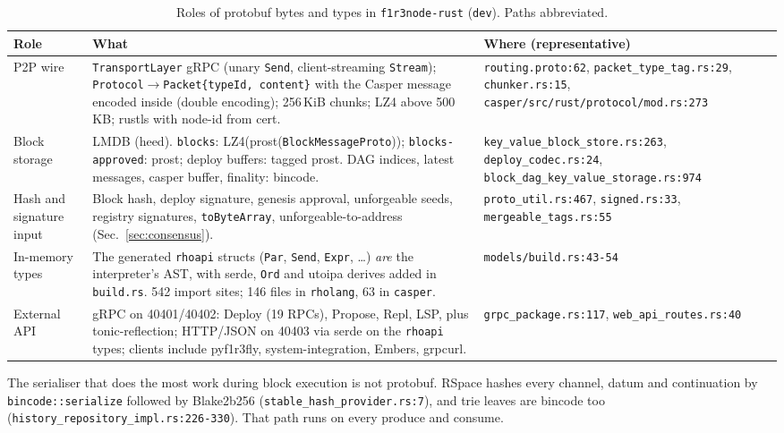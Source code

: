 \documentclass[10pt,a4paper]{article}
\newcommand{\f}[1]{\nolinkurl{#1}}
\begin{document}
\begin{table}[h]
\centering\small
\begin{tabular}{@{}L{2.6cm}L{7.4cm}L{5.4cm}@{}}
\toprule
Role & What & Where (representative) \\
\midrule
P2P wire &
  \f{TransportLayer} gRPC (unary \f{Send}, client-streaming \f{Stream}); \f{Protocol}$\to$\texttt{Packet\{typeId, content\}} with the Casper message encoded inside (double encoding); 256\,KiB chunks; LZ4 above 500\,KB; rustls with node-id from cert. &
  \f{routing.proto:62}, \f{packet_type_tag.rs:29}, \f{chunker.rs:15}, \f{casper/src/rust/protocol/mod.rs:273} \\
Block storage &
  LMDB (heed). \f{blocks}: LZ4(prost(\f{BlockMessageProto})); \f{blocks-approved}: prost; deploy buffers: tagged prost. DAG indices, latest messages, casper buffer, finality: bincode. &
  \f{key_value_block_store.rs:263}, \f{deploy_codec.rs:24}, \f{block_dag_key_value_storage.rs:974} \\
Hash and signature input &
  Block hash, deploy signature, genesis approval, unforgeable seeds, registry signatures, \f{toByteArray}, unforgeable-to-address (Sec.~\ref{sec:consensus}). &
  \f{proto_util.rs:467}, \f{signed.rs:33}, \f{mergeable_tags.rs:55} \\
In-memory types &
  The generated \f{rhoapi} structs (\f{Par}, \f{Send}, \f{Expr}, \ldots) \emph{are} the interpreter's AST, with serde, \f{Ord} and utoipa derives added in \f{build.rs}. 542 import sites; 146 files in \f{rholang}, 63 in \f{casper}. &
  \f{models/build.rs:43-54} \\
External API &
  gRPC on 40401/40402: Deploy (19 RPCs), Propose, Repl, LSP, plus tonic-reflection; HTTP/JSON on 40403 via serde on the \f{rhoapi} types; clients include pyf1r3fly, system-integration, Embers, grpcurl. &
  \f{grpc_package.rs:117}, \f{web_api_routes.rs:40} \\
\bottomrule
\end{tabular}
\caption{Roles of protobuf bytes and types in \f{f1r3node-rust} (\f{dev}). Paths abbreviated.}
\label{tab:roles}
\end{table}

\noindent The serialiser that does the most work during block execution is not protobuf. RSpace
hashes every channel, datum and continuation by \f{bincode::serialize} followed by Blake2b256
(\f{stable_hash_provider.rs:7}), and trie leaves are bincode too
(\f{history_repository_impl.rs:226-330}). That path runs on every produce and consume.
\end{document}

